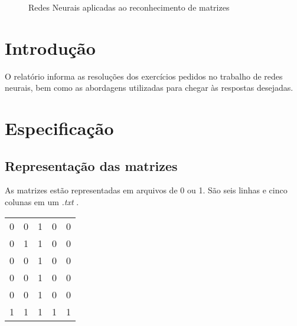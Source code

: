 \documentclass[hidelinks,12pt]{article}
\newcommand{\bigicon}[1]{\texttt{[image: \#1]}}
\begin{document}
\pagestyle{fancy}


\lhead{\bigicon{Figures/ufu}}
\rhead{\bigicon{Figures/facom}}
\lfoot{}
\cfoot{}
\rfoot{}
\vspace*{10cm}
\begin{figure}[!h]
	\centering
	\Huge{Redes Neurais aplicadas ao reconhecimento de matrizes}
\end{figure}


\newpage
\fancyhead[C]{}
\fancyhead[R]{}
\fancyhead[L]{\leftmark}
\fancyfoot{}
\fancyfoot[C]{\hspace{1.5cm}\thepage}


\tableofcontents

{\let\thefootnote\relax{}}

\newpage

\section{Introdução}

	O relatório informa as resoluções dos exercícios pedidos no trabalho de redes neurais, bem como as abordagens utilizadas para chegar às respostas desejadas.

\section{Especificação}
	
	
	\subsection{Representação das matrizes}
	
		As matrizes estão representadas em arquivos de 0 ou 1. São seis linhas e cinco colunas em um \emph{.txt} . 
		\begin{table}[!h]
			\centering
			\begin{tabular}{lllll}
				0 & 0 & 1 & 0 & 0 \\
				0 & 1 & 1 & 0 & 0 \\
				0 & 0 & 1 & 0 & 0 \\
				0 & 0 & 1 & 0 & 0 \\
				0 & 0 & 1 & 0 & 0 \\
				1 & 1 & 1 & 1 & 1
			\end{tabular}
		\end{table}
		
\end{document}
